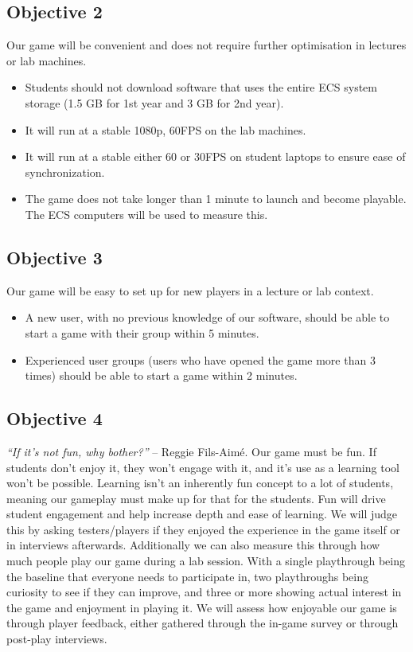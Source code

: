 \documentclass{article}
\begin{document}
\subsection*{Objective 2}
Our game will be convenient and does not require further optimisation in lectures or lab machines.
\begin{itemize}
    \item Students should not download software that uses the entire ECS system storage (1.5 GB for 1st year and 3 GB for 2nd year).
    \item It will run at a stable 1080p, 60FPS on the lab machines.
    \item It will run at a stable either 60 or 30FPS on student laptops to ensure ease of synchronization.
    \item The game does not take longer than 1 minute to launch and become playable. The ECS computers will be used to measure this.
\end{itemize}


\subsection*{Objective 3}
Our game will be easy to set up for new players in a lecture or lab context.
\begin{itemize}
    \item A new user, with no previous knowledge of our software, should be able to start a game with their group within 5 minutes.
    \item Experienced user groups (users who have opened the game more than 3 times) should be able to start a game within 2 minutes.
\end{itemize}

\subsection*{Objective 4}
\textit{“If it’s not fun, why bother?”} – Reggie Fils-Aimé.
\newline
Our game must be fun. If students don’t enjoy it, they won’t engage with it, and it's use as a learning tool won't be possible. Learning isn't an inherently fun concept to a lot of students, meaning our gameplay must make up for that for the students. Fun will drive student engagement and help increase depth and ease of learning. 
\newline\newline
We will judge this by asking testers/players if they enjoyed the experience in the game itself or in interviews afterwards. Additionally we can also measure this through how much people play our game during a lab session. With a single playthrough being the baseline that everyone needs to participate in, two playthroughs being curiosity to see if they can improve, and three or more showing actual interest in the game and enjoyment in playing it. We will assess how enjoyable our game is through player feedback, either gathered through the in-game survey or through post-play interviews.
\end{document}
